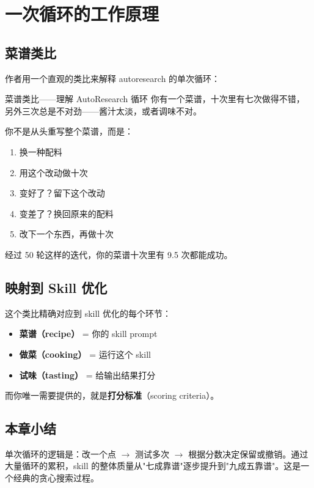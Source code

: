 \section{一次循环的工作原理}

\subsection{菜谱类比}

作者用一个直观的类比来解释 autoresearch 的单次循环：

\begin{knowledgebox}{菜谱类比——理解 AutoResearch 循环}
你有一个菜谱，十次里有七次做得不错，另外三次总是不对劲——酱汁太淡，或者调味不对。

你不是从头重写整个菜谱，而是：
\begin{enumerate}
    \item 换一种配料
    \item 用这个改动做十次
    \item 变好了？留下这个改动
    \item 变差了？换回原来的配料
    \item 改下一个东西，再做十次
\end{enumerate}

经过 50 轮这样的迭代，你的菜谱十次里有 9.5 次都能成功。
\end{knowledgebox}

\subsection{映射到 Skill 优化}

这个类比精确对应到 skill 优化的每个环节：

\begin{itemize}
    \item \textbf{菜谱（recipe）} = 你的 skill prompt
    \item \textbf{做菜（cooking）} = 运行这个 skill
    \item \textbf{试味（tasting）} = 给输出结果打分
\end{itemize}

而你唯一需要提供的，就是\textbf{打分标准}（scoring criteria）。

\subsection{本章小结}

单次循环的逻辑是：改一个点 $\to$ 测试多次 $\to$ 根据分数决定保留或撤销。通过大量循环的累积，skill 的整体质量从"七成靠谱"逐步提升到"九成五靠谱"。这是一个经典的贪心搜索过程。

